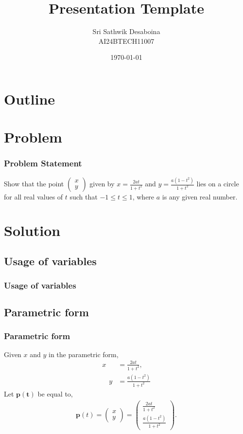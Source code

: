 \documentclass{beamer}
\title{Presentation Template}
\author{Sri Sathwik Desaboina \\ AI24BTECH11007}
\date{\today}
\theoremstyle{remark}
\newcommand{\myvec}[1]{\ensuremath{\begin{pmatrix}#1\end{pmatrix}}}
\let\vec\mathbf
\numberwithin{equation}{section}
\begin{document}
\begin{frame}
\titlepage
\end{frame}

\section*{Outline}
\begin{frame}
\tableofcontents
\end{frame}
\section{Problem}
\begin{frame}
\frametitle{Problem Statement}
%

Show that the point $\myvec{x \\ y}$ given by $x = \frac{2at}{1 + t^2}$ and $y = \frac{a(1 - t^2)}{1 + t^2}$ lies on a circle for all real values of $t$ such that $-1 \leq t \leq 1$, where $a$ is any given real number.
\end{frame}

\section{Solution}
\subsection{Usage of variables}
\begin{frame}
\frametitle{Usage of variables}
	
\end{frame}
\subsection{Parametric form}
\begin{frame}
\frametitle{Parametric form}
Given $x$ and $y$ in the parametric form,\\
	\begin{align}
		x &= \frac{2at}{1 + t^2},\\
		\quad y &= \frac{a(1 - t^2)}{1 + t^2}
	\end{align}
	Let $\vec{p(t)}$ be equal to,\\
	\begin{align}
	\mathbf{p}(t) = \myvec{x \\ y} = \myvec{\frac{2at}{1 + t^2} \\ \frac{a(1 - t^2)}{1 + t^2}}.
	\end{align}


\end{frame}
\end{document}
